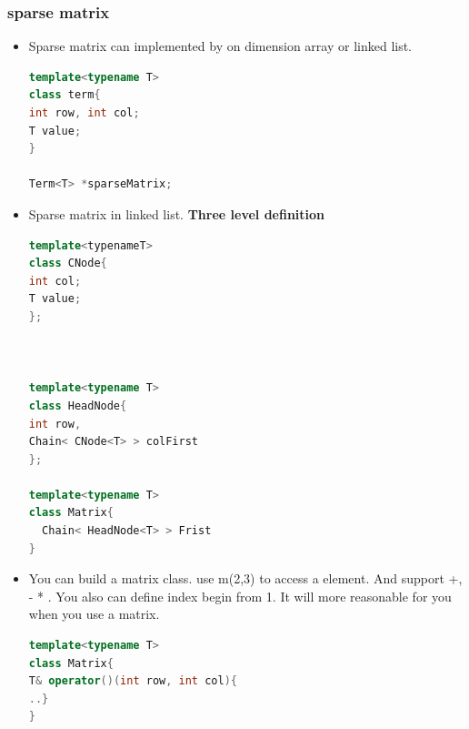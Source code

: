 \documentclass[a4paper,11pt,twoside]{book}
\begin{document}
\subsubsection{sparse matrix}
\begin{itemize}
\item Sparse matrix can implemented by on dimension array or  linked list. 
\begin{lstlisting}[frame=single, language=c++]
template<typename T>
class term{
int row, int col;
T value;
}

Term<T> *sparseMatrix;
\end{lstlisting}

\item Sparse matrix in linked list.  \textbf{Three level definition}
\begin{lstlisting}[frame=single, language=c++]
template<typenameT>
class CNode{
int col;
T value;
};



template<typename T>
class HeadNode{
int row, 
Chain< CNode<T> > colFirst
};
  
template<typename T>
class Matrix{
  Chain< HeadNode<T> > Frist
} 
\end{lstlisting}


	\item You can build a matrix class. use m(2,3) to access a element. And support +, - * . You also can define index begin from 1. It will more reasonable for you when you use a matrix. 
\begin{lstlisting}[frame=single, language=c++]
template<typename T>
class Matrix{
T& operator()(int row, int col){
..}
}
\end{lstlisting} 

\end{itemize}
\end{document}
